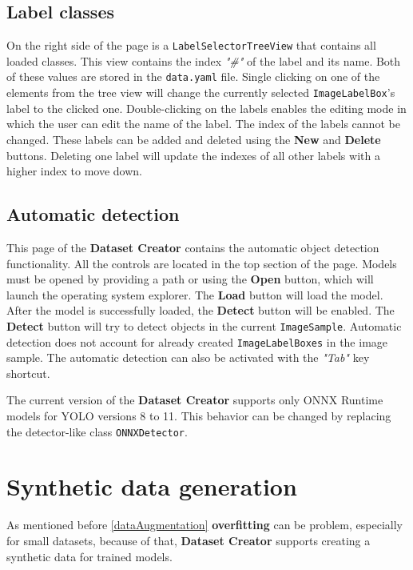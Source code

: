 \subsection{Label classes}
On the right side of the page is a \texttt{LabelSelectorTreeView} that contains all loaded classes. This view contains the index \textit{"\#"} of the label and its name. Both of these values are stored in the \texttt{data.yaml} file. Single clicking on one of the elements from the tree view will change the currently selected \texttt{ImageLabelBox}'s label to the clicked one. Double-clicking on the labels enables the editing mode in which the user can edit the name of the label. The index of the labels cannot be changed. These labels can be added and deleted using the \textbf{New} and \textbf{Delete} buttons. Deleting one label will update the indexes of all other labels with a higher index to move down.

\subsection{Automatic detection}
This page of the \textbf{Dataset Creator} contains the automatic object detection functionality. All the controls are located in the top section of the page. Models must be opened by providing a path or using the \textbf{Open} button, which will launch the operating system explorer. The \textbf{Load} button will load the model. After the model is successfully loaded, the \textbf{Detect} button will be enabled. The \textbf{Detect} button will try to detect objects in the current \texttt{ImageSample}. Automatic detection does not account for already created \texttt{ImageLabelBoxes} in the image sample. The automatic detection can also be activated with the \textit{"Tab"} key shortcut.  

The current version of the \textbf{Dataset Creator} supports only ONNX Runtime models for YOLO versions 8 to 11. This behavior can be changed by replacing the detector-like class  \texttt{ONNXDetector}.





\section{Synthetic data generation}
As mentioned before \ref{dataAugmentation} \textbf{overfitting} can be problem, especially for small datasets, because of that, \textbf{Dataset Creator} supports creating a synthetic data for trained models.

